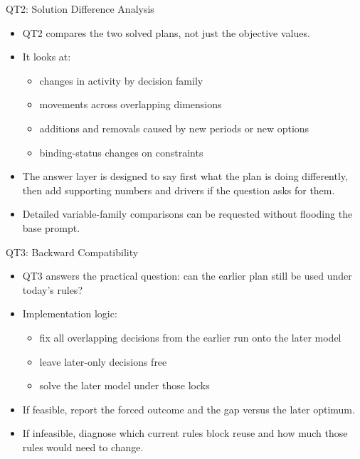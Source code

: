 \documentclass[10pt]{beamer}
\begin{document}
\begin{frame}{QT2: Solution Difference Analysis}
  \begin{itemize}
    \item QT2 compares the two solved plans, not just the objective values.
    \item It looks at:
    \begin{itemize}
      \item changes in activity by decision family
      \item movements across overlapping dimensions
      \item additions and removals caused by new periods or new options
      \item binding-status changes on constraints
    \end{itemize}
    \item The answer layer is designed to say first what the plan is doing differently, then add supporting numbers and drivers if the question asks for them.
    \item Detailed variable-family comparisons can be requested without flooding the base prompt.
  \end{itemize}
\end{frame}

\begin{frame}{QT3: Backward Compatibility}
  \begin{itemize}
    \item QT3 answers the practical question: can the earlier plan still be used under today's rules?
    \item Implementation logic:
    \begin{itemize}
      \item fix all overlapping decisions from the earlier run onto the later model
      \item leave later-only decisions free
      \item solve the later model under those locks
    \end{itemize}
    \item If feasible, report the forced outcome and the gap versus the later optimum.
    \item If infeasible, diagnose which current rules block reuse and how much those rules would need to change.
  \end{itemize}
\end{frame}
\end{document}
